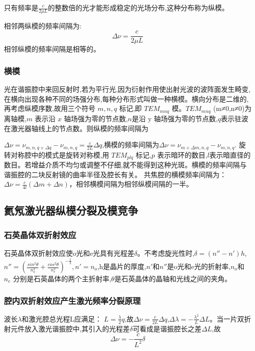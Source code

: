 \documentclass[12pt, a4paper]{article}
\begin{document}
只有频率是$\frac{c}{2\mu L}$的整数倍的光才能形成稳定的光场分布,这种分布称为纵模。

相邻两纵模的频率间隔为:
\begin{equation}
    \Delta \nu =  \frac{c}{2\mu L}
\end{equation}
相邻纵模的频率间隔是相等的。

\subsubsection{横模}
光在谐振腔中来回反射时,若为平行光,因为衍射作用使出射光波的波阵面发生畸变,在横向出现各种不同的场强分布,每种分布形式叫做一种横模。横向分布是二维的,再考虑纵模序数,故用三个符号 $m, n, q$ 标记,即 $TEM_{mnq}$ 模。$TEM_{mnq}$ (m≠0,n≠0)为离轴模,$m$ 表示沿 $x$ 轴场强为零的节点数,$n$是沿 y 轴场强为零的节点数,$q$表示驻波在激光器轴线上的节点数。则纵模的频率间隔为

$\Delta \nu = \nu_{m,n,q+\Delta q} - \nu_{m,n,q} = \frac{c}{2L}\Delta q$,横模的频率间隔为$\Delta \nu = \nu_{m+\Delta m,n,q} - \nu_{m,n,q}$.
旋转对称腔中的模式是旋转对称模,用 $TEM_{plq}$ 标记,$p$ 表示暗环的数目,$l$表示暗直径的数目。若增益介质不均匀或调整不仔细,就不能得到这种光斑。横模的频率间隔与谐振腔的二块反射镜的曲率半径及腔长有关。
共焦腔的横模频率间隔为：
$\Delta \nu = \frac{c}{4l}(\Delta m +\Delta n)$，相邻横模间隔为相邻纵模间隔的一半。

\subsection{氦氖激光器纵模分裂及模竞争}
\subsubsection{石英晶体双折射效应}
石英晶体双折射效应使o光和e光具有光程差$\delta$。不考虑旋光性时,$\delta=(n''-n')h$,
$n'' = (\frac{sin^2\theta}{n_o^2} + \frac{cos^2\theta}{n_e^2} )^{-\frac{1}{2}},n'=n_o$,h是晶片的厚度,$n'$和$n''$是o光和e光的折射率,$n_o$和 $n_e$ 分别是石英晶体的两个主折射率,$\theta$是石英晶体的晶轴和光线之间的夹角。

\subsubsection{腔内双折射效应产生激光频率分裂原理}
波长$\lambda$和激光腔总光程L应满足：
$L= \frac{\lambda}{2}q$,故$\Delta \nu = \frac{c}{2L} \Delta q$,$\Delta \lambda = -\frac{\lambda^2}{L}\Delta L$。当一片双折射元件放入激光谐振腔中,其引入的光程差$\delta$可看成是谐振腔长之差$\Delta L$,故
\begin{equation}
\Delta \nu= -\frac{c}{L^2}\delta
\end{equation}
\end{document}

